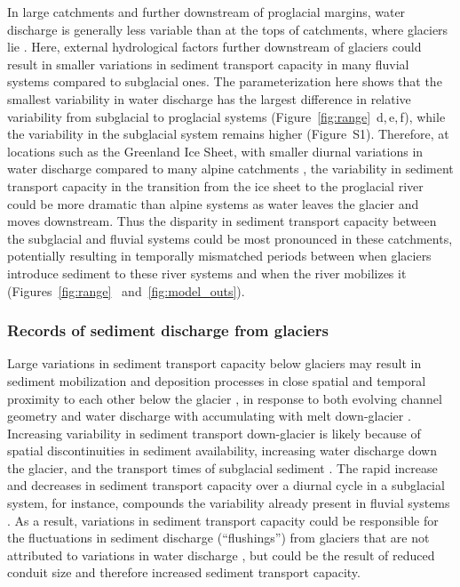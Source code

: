 \documentclass[11pt]{article}
\begin{document}
\begin{spacing}{1}
  In large catchments and further downstream of proglacial margins, water discharge is generally less variable than at the tops of catchments, where glaciers lie \citep[c.f.][]{costa2017,vanas2017,delaney2018,hasholt2018}.
  Here, external hydrological factors further downstream of glaciers could result in smaller variations in sediment transport capacity in many fluvial systems compared to subglacial ones.
  The parameterization here shows that the smallest variability in water discharge has the largest difference in relative variability from subglacial to proglacial systems (Figure~\ref{fig:range}\, d,\,e,\,f), while the variability in the subglacial system remains higher (Figure~S1).
  Therefore, at locations such as the Greenland Ice Sheet, with smaller diurnal variations in water discharge compared to many alpine catchments \citep[c.f.][]{delaney2018,hasholt2018}, the variability in sediment transport capacity in the transition from the ice sheet to the proglacial river could be more dramatic than alpine systems as water leaves the glacier and moves downstream.
  Thus the disparity in sediment transport capacity between the subglacial and fluvial systems could be most pronounced in these catchments, potentially resulting in temporally mismatched periods between when glaciers introduce sediment to these river systems  and when the river mobilizes it (Figures~\ref{fig:range}~ and~\ref{fig:model_outs}).
  
  
  \subsubsection{Records of sediment discharge  from glaciers}
  
  Large variations in sediment transport capacity below glaciers may result in sediment mobilization and deposition processes in close spatial and temporal proximity to each other below the glacier \citep{gimbert2016,perolo2018}, in response to both evolving channel geometry and water discharge with accumulating with melt down-glacier \citep{beaud2018,delaney2019}.
  Increasing variability in sediment transport down-glacier is likely because of spatial discontinuities in sediment availability, increasing water discharge down the glacier, and the transport times of subglacial sediment \citep{williams1989,delaney2019}.
  The rapid increase and decreases in sediment transport capacity over a diurnal cycle in a subglacial system, for instance, compounds the variability already present in fluvial systems \citep{williams1989,jerolmack2010}.
  As a result, variations in sediment transport capacity could be responsible for the fluctuations in sediment discharge (``flushings'') from glaciers that are not attributed to variations in water discharge \citep[e.g.][]{richards2003,swift2021}, but could be the result of reduced conduit size and therefore increased sediment transport capacity.


\end{spacing}
\end{document}
